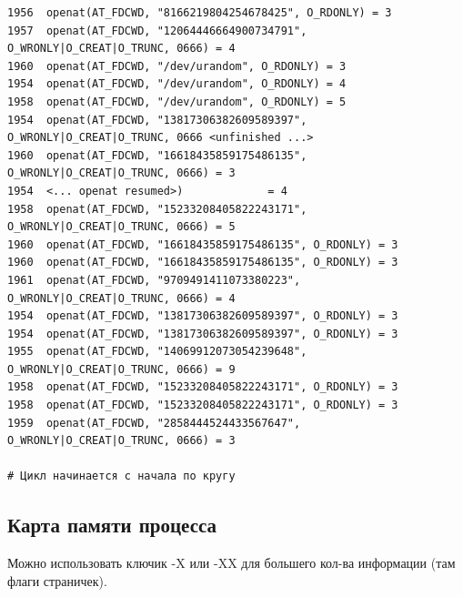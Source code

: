 \documentclass[11pt, a4paper]{article}
\begin{document}
\begin{Verbatim}[fontsize=\small,breaklines=true]
1956  openat(AT_FDCWD, "8166219804254678425", O_RDONLY) = 3
1957  openat(AT_FDCWD, "12064446664900734791", O_WRONLY|O_CREAT|O_TRUNC, 0666) = 4
1960  openat(AT_FDCWD, "/dev/urandom", O_RDONLY) = 3
1954  openat(AT_FDCWD, "/dev/urandom", O_RDONLY) = 4
1958  openat(AT_FDCWD, "/dev/urandom", O_RDONLY) = 5
1954  openat(AT_FDCWD, "13817306382609589397", O_WRONLY|O_CREAT|O_TRUNC, 0666 <unfinished ...>
1960  openat(AT_FDCWD, "16618435859175486135", O_WRONLY|O_CREAT|O_TRUNC, 0666) = 3
1954  <... openat resumed>)             = 4
1958  openat(AT_FDCWD, "15233208405822243171", O_WRONLY|O_CREAT|O_TRUNC, 0666) = 5
1960  openat(AT_FDCWD, "16618435859175486135", O_RDONLY) = 3
1960  openat(AT_FDCWD, "16618435859175486135", O_RDONLY) = 3
1961  openat(AT_FDCWD, "9709491411073380223", O_WRONLY|O_CREAT|O_TRUNC, 0666) = 4
1954  openat(AT_FDCWD, "13817306382609589397", O_RDONLY) = 3
1954  openat(AT_FDCWD, "13817306382609589397", O_RDONLY) = 3
1955  openat(AT_FDCWD, "14069912073054239648", O_WRONLY|O_CREAT|O_TRUNC, 0666) = 9
1958  openat(AT_FDCWD, "15233208405822243171", O_RDONLY) = 3
1958  openat(AT_FDCWD, "15233208405822243171", O_RDONLY) = 3
1959  openat(AT_FDCWD, "2858444524433567647", O_WRONLY|O_CREAT|O_TRUNC, 0666) = 3

# Цикл начинается с начала по кругу 
\end{Verbatim}



\subsection{Карта памяти процесса}
Можно использовать ключик -X или -XX для большего кол-ва информации (там флаги страничек).
\end{document}
